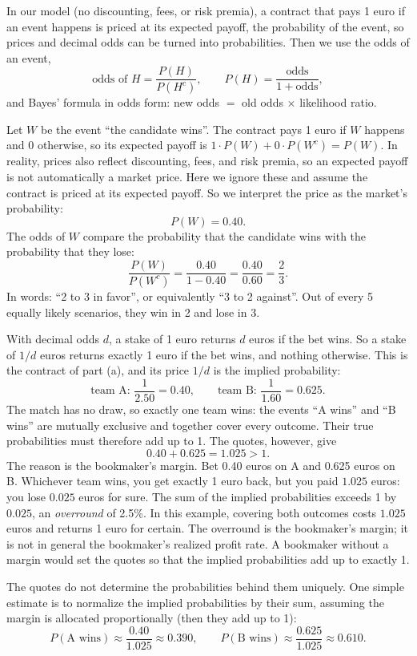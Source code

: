 \begin{solution}
	\idea In our model (no discounting, fees, or risk premia), a contract that
	pays 1 euro if an event happens is priced at its expected payoff, the
	probability of the event, so prices and decimal odds can be turned into
	probabilities. Then we use the odds of an event,
	\[ \text{odds of } H=\frac{P(H)}{P(H^c)},\qquad
		P(H)=\frac{\text{odds}}{1+\text{odds}}, \]
	and Bayes' formula in odds form: new odds $=$ old odds $\times$ likelihood
	ratio.

	 Let $W$ be the event ``the candidate wins''. The contract pays 1
	euro if $W$ happens and 0 otherwise, so its expected payoff is
	$1\cdot P(W)+0\cdot P(W^c)=P(W)$. In reality, prices also reflect
	discounting, fees, and risk premia, so an expected payoff is not
	automatically a market price. Here we ignore these and assume the contract
	is priced at its expected payoff. So we interpret the price as the
	market's probability:
	\[ P(W)=0.40. \]
	The odds of $W$ compare the probability that the candidate wins with the
	probability that they lose:
	\[ \frac{P(W)}{P(W^c)}=\frac{0.40}{1-0.40}=\frac{0.40}{0.60}=\frac23. \]
	In words: ``2 to 3 in favor'', or equivalently ``3 to 2 against''. Out of
	every 5 equally likely scenarios, they win in 2 and lose in 3.

	 With decimal odds $d$, a stake of 1 euro returns $d$ euros if
	the bet wins. So a stake of $1/d$ euros returns exactly 1 euro if the bet
	wins, and nothing otherwise. This is the contract of part (a), and its
	price $1/d$ is the implied probability:
	\[ \text{team A: } \frac{1}{2.50}=0.40,\qquad
		\text{team B: } \frac{1}{1.60}=0.625. \]
	The match has no draw, so exactly one team wins: the events ``A wins'' and
	``B wins'' are mutually exclusive and together cover every outcome. Their
	true probabilities must therefore add up to 1. The quotes, however, give
	\[ 0.40+0.625=1.025>1. \]
	The reason is the bookmaker's margin. Bet 0.40 euros on A and 0.625 euros
	on B. Whichever team wins, you get exactly 1 euro back, but you paid
	$1.025$ euros: you lose $0.025$ euros for sure. The sum of the implied probabilities
	exceeds 1 by $0.025$, an \emph{overround} of 2.5\%. In this example,
	covering both outcomes costs $1.025$ euros and returns 1 euro for certain.
	The overround is the bookmaker's margin; it is not in general the
	bookmaker's realized profit rate. A bookmaker without a margin would set
	the quotes so that the implied probabilities add up to exactly 1.

	The quotes do not determine the probabilities behind them uniquely. One
	simple estimate is to normalize the implied probabilities by their sum,
	assuming the margin is allocated proportionally (then they add up to 1):
	\[ P(\text{A wins})\approx\frac{0.40}{1.025}\approx 0.390,\qquad
		P(\text{B wins})\approx\frac{0.625}{1.025}\approx 0.610. \]


\end{solution}
